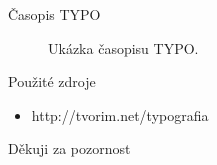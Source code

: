 \documentclass[fyma2,pdf,final]{prosper}
\begin{document}
\begin{slide}{Časopis TYPO}

\begin{center}
		 \begin{figure}
			\tiny{\caption{Ukázka časopisu TYPO.}}
		 \end{figure}
        \end{center}
\end{slide}

\begin{slide}{Použité zdroje}
\begin{itemize}
		\item http://tvorim.net/typografia
\end{itemize}
\end{slide}
\begin{slide}{}
\vspace{42pt}
\begin{center}
{\large Děkuji za pozornost}
\end{center}
\end{slide}
\end{document}
